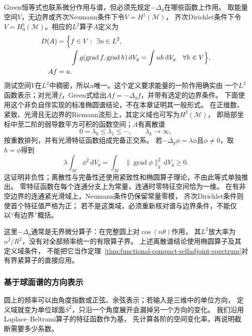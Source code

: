 Green恒等式也联系微分作用与谱，但必须先规定$-\Delta_g$在哪些函数上作用。
取能量空间$V$，无边界或齐次Neumann条件下令$V=H^1(\mathcal M)$，
齐次Dirichlet条件下令$V=H_0^1(\mathcal M)$。相应的$L^2$算子$A$定义为
\[
 \begin{aligned}
 D(A)&=\Bigl\{f\in V:\ \exists u\in L^2,\\
 &\qquad\int g(\operatorname{grad}f,\operatorname{grad}h)\,\mathrm dV_g
 =\int uh\,\mathrm dV_g\quad\forall h\in V\Bigr\},\\
 Af&=u.
 \end{aligned}
\]
测试空间$V$在$L^2$中稠密，所以$u$唯一。这个定义要求能量的一阶作用确实由
一个$L^2$函数表示；对光滑$f$，Green式给出$Af=-\Delta_gf$，并带有选定的边界条件。
下面使用这个非负自伴实现的标准椭圆谱结论，不在本章证明其一般形式。
在正维数、紧致、光滑且无边界的Riemann流形上，其定义域也可写为$H^2(\mathcal M)$，
即局部坐标中至二阶的弱导数平方可积的函数空间；$A$有离散谱
\[
 0=\lambda_0\leq\lambda_1\leq\cdots,\qquad\lambda_k\longrightarrow\infty,
\]
按重数排列，并有光滑特征函数组成完备正交系。
若$-\Delta_g\phi=\lambda\phi$且$\phi\neq0$，取$h=\phi$得到
\[
 \lambda\int_{\mathcal M}\phi^2\,\mathrm dV_g
 =\int_{\mathcal M}\lVert\operatorname{grad}\phi\rVert_g^2\,\mathrm dV_g
 \geq0.
\]
这证明非负性；离散性与完备性还使用紧致性和椭圆算子理论，不由此等式单独推出。
零特征函数在每个连通分支上为常量，连通时零特征空间恰为一维。
在有非空边界的连通紧光滑域上，Neumann条件仍保留常量零模，
齐次Dirichlet条件则使首个特征值严格为正；
若不是这类域，必须重新核对谱与边界条件，不能仅以“有边界”概括。


这里$-\Delta_g$通常是无界微分算子：在完整圆上对$\cos(n\theta)$作用，
其$L^2$放大率为$n^2/R^2$，没有对全部频率统一的有限算子界。
上述离散谱结论使用椭圆算子及其定义域条件，
不能把它当作定理~\ref{thm:functional-compact-selfadjoint-spectrum}对有界紧算子的直接应用。

\subsubsection{基于球面谱的方向表示}
\label{sec:functional-spherical-spectral-representation}

圆上的频率可以由角度指数或正弦、余弦表示；若输入是三维中的单位方向，
定义域就变为单位球面$S^2$，只沿一个角度展开会漏掉另一个方向的变化。
我们沿用Laplace--Beltrami算子的特征函数作为基，
先计算各阶的空间变化率，再说明截断需要多少系数。

